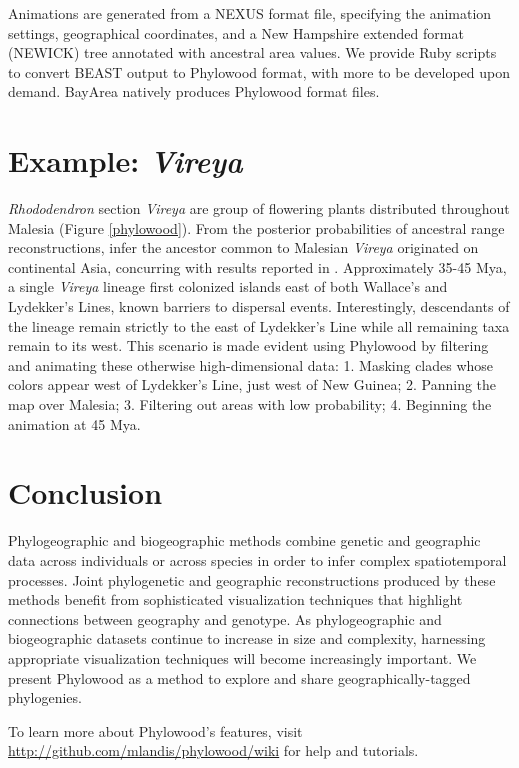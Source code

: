 \documentclass{bioinfo}
\begin{document}
Animations are generated from a NEXUS format file, specifying the animation settings, geographical coordinates, and a New Hampshire extended format (NEWICK) tree annotated with ancestral area values. We provide Ruby scripts to convert BEAST output to Phylowood format, with more to be developed upon demand. BayArea natively produces Phylowood format files.

\section{Example: {\it Vireya}}
{\it Rhododendron} section {\it Vireya} are group of flowering plants distributed throughout Malesia (Figure \ref{phylowood}). From the posterior probabilities of ancestral range reconstructions, \cite{landis13} infer the ancestor common to Malesian {\it Vireya} originated on continental Asia, concurring with results reported in \cite{webb12}. Approximately 35-45 Mya, a single {\it Vireya} lineage first colonized islands east of both Wallace's and Lydekker's Lines, known barriers to dispersal events. Interestingly, descendants of the lineage remain strictly to the east of Lydekker's Line while all remaining taxa remain to its west. This scenario is made evident using Phylowood by filtering and animating these otherwise high-dimensional data: 1. Masking clades whose colors appear west of Lydekker's Line, just west of New Guinea; 2. Panning the map over Malesia; 3. Filtering out areas with low probability; 4. Beginning the animation at 45 Mya.

\section{Conclusion}
Phylogeographic and biogeographic methods combine genetic and geographic data across individuals or across species in order to infer complex spatiotemporal processes. Joint phylogenetic and geographic reconstructions produced by these methods benefit from sophisticated visualization techniques that highlight connections between geography and genotype. As phylogeographic and biogeographic datasets continue to increase in size and complexity, harnessing appropriate visualization techniques will become increasingly important. We present Phylowood as a method to explore and share geographically-tagged phylogenies. 

To learn more about Phylowood's features, visit \\
 \href{http://github.com/mlandis/phylowood/wiki}{http://github.com/mlandis/phylowood/wiki} for help and tutorials.
 
\end{document}
